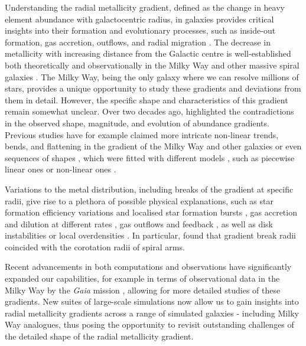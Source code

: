 \documentclass[twocolumn,apj,numberedappendix,appendixfloats]{openjournal}
\begin{document}
\begin{CJK*}{UTF8}{gbsn}
Understanding the radial metallicity gradient, defined as the change in heavy element abundance with galactocentric radius, in galaxies provides critical insights into their formation and evolutionary processes, such as inside-out formation, gas accretion, outflows, and radial migration \citep[e.g.][]{Quirk1973, Tinsley1980, Lacey1985, Wyse1989, Kauffman1996, Chiappini1997, Schoenrich2009b, Moran2012, Bird2013}. The decrease in metallicity with increasing distance from the Galactic centre is well-established both theoretically \citep{Larson1976, Tinsley1980, Chiosi1980} and observationally in the Milky Way \citep{Searle1971, Janes1979, Twarog1997} and other massive spiral galaxies \citep[e.g.][]{Tinsley1980, Zaritsky1994,Bresolin2012}. The Milky Way, being the only galaxy where we can resolve millions of stars, provides a unique opportunity to study these gradients and deviations from them in detail. However, the specific shape and characteristics of this gradient remain somewhat unclear. Over two decades ago, \citet{Chiappini2002} highlighted the contradictions in the observed shape, magnitude, and evolution of abundance gradients. Previous studies have for example claimed more intricate non-linear trends, bends, and flattening in the gradient of the Milky Way \citep[e.g.][]{Donor2020} and other galaxies \citep[e.g.][]{Pilyugin2003, Sanchez2014} or even sequences of shapes \citep{Pilyugin2017, Pilyugin2024}, which were fitted with different models \citep{RosalesOrtega2011, Bresolin2012}, such as piecewise linear ones \citep[e.g.][]{SanchezMenguiano2016} or non-linear ones \citep[e.g.][]{Scarano2013}.

Variations to the metal distribution, including breaks of the gradient at specific radii, give rise to a plethora of possible physical explanations, such as star formation efficiency variations and localised star formation bursts \citep{Sanchez2014, SanchezBlazquez2014, Ho2015}, gas accretion and dilution at different rates \citep{Bresolin2012, Sanchez2013, Belfiore2016, SanchezMenguiano2016}, gas outflows and feedback \citep{Lilly2013, Ma2017b}, as well as disk instabilities or local overdensities \citep{Grand2016, Ho2017c}. In particular, \citet{Scarano2013} found that gradient break radii coincided with the corotation radii of spiral arms.

Recent advancements in both computations and observations have significantly expanded our capabilities, for example in terms of observational data in the Milky Way by the \textit{Gaia} mission \citep{Gaia-Collaboration2016}, allowing for more detailed studies of these gradients. New suites of large-scale simulations now allow us to gain insights into radial metallicity gradients across a range of simulated galaxies - including Milky Way analogues, thus posing the opportunity to revisit outstanding challenges of the detailed shape of the radial metallicity gradient.


\end{CJK*}
\end{document}
